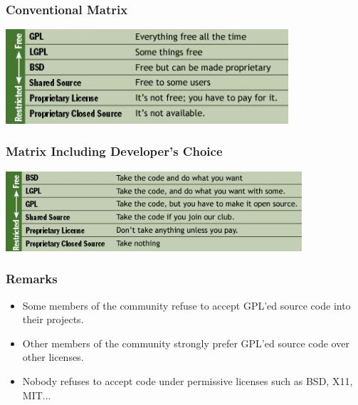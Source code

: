 \documentclass{beamer}
\begin{document}

\begin{frame}
\frametitle{Conventional Matrix}

\begin{center}
\includegraphics[width=10.5cm]{figs/conventional_matrix.png}
\end{center}

\end{frame}


\begin{frame}
\frametitle{Matrix Including Developer's Choice}

\begin{center}
\includegraphics[width=11cm]{figs/matrix_developers_choice.png}
\end{center}

\end{frame}



\begin{frame}
\frametitle{Remarks}

\begin{itemize}
\item Some members of the community refuse to accept GPL'ed source code into their projects.
\item Other members of the community strongly prefer GPL'ed source code over other licenses.
\item \alert{Nobody refuses} to accept code under \alert{permissive licenses} such as BSD, X11, MIT... 
\end{itemize}

\end{frame}
\end{document}
